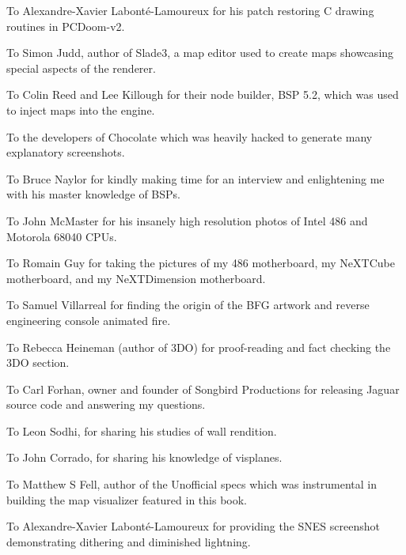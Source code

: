 \par
To Alexandre-Xavier Labont\'e-Lamoureux for his patch restoring C drawing routines in PCDoom-v2.\\
\par
To Simon Judd, author of Slade3, a map editor used to create maps showcasing special aspects of the renderer.\\
\par
To Colin Reed and Lee Killough for their node builder, BSP 5.2, which was used to inject maps into the \doom{} engine.\\
\par
To the developers of Chocolate \doom{} which was heavily hacked to generate many explanatory screenshots.\\
\par
To Bruce Naylor for kindly making time for an interview and enlightening me with his master knowledge of BSPs.\\
\par
To John McMaster for his insanely high resolution photos of Intel 486 and Motorola 68040 CPUs.\\
\par
To Romain Guy for taking the pictures of my 486 motherboard, my NeXTCube motherboard, and my NeXTDimension motherboard.\\
\par
To Samuel Villarreal for finding the origin of the BFG artwork and reverse engineering \doom{} console animated fire.\\
\par
To Rebecca Heineman (author of \doom{} 3DO) for proof-reading and fact checking the 3DO section.\\
\par
To Carl Forhan, owner and founder of Songbird Productions for releasing \doom{} Jaguar source code and answering my questions.\\
\par
To Leon Sodhi, for sharing his studies of \doom{} wall rendition.\\
\par
To John Corrado, for sharing his knowledge of visplanes.\\
\par
To Matthew S Fell, author of the Unofficial \doom{} specs which was instrumental in building the map visualizer featured in this book.\\
\par
To Alexandre-Xavier Labont\'{e}-Lamoureux for providing the SNES screenshot demonstrating dithering and diminished lightning.\\
